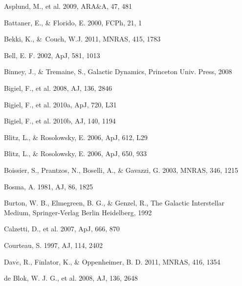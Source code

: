 \documentclass[12pt,preprint]{aastex}
\begin{document}
\begin{thebibliography}{}

 Asplund, M., et al. 2009, ARA\&A, 47, 481

 Battaner, E., \& Florido, E. 2000, FCPh, 21, 1

         Bekki, K., \&\ Couch, W.J. 2011, MNRAS, 415, 1783

 Bell, E. F. 2002, ApJ, 581, 1013

 Binney, J., \& Tremaine, S., Galactic Dynamics, Princeton Univ. Press, 2008


Bigiel, F., et al. 2008, AJ, 136, 2846

Bigiel, F., et al. 2010a, ApJ, 720, L31

Bigiel, F., et al. 2010b, AJ, 140, 1194


 Blitz, L., \& Rosolowsky, E. 2006, ApJ, 612, L29

 Blitz, L., \& Rosolowsky, E. 2006, ApJ, 650, 933

 Boissier, S., Prantzos, N., Boselli, A., \& Gavazzi, G. 2003, MNRAS, 346, 1215

 Bosma, A. 1981, AJ, 86, 1825



 Burton, W. B., Elmegreen, B. G., \& Genzel, R., The Galactic Interstellar Medium, Springer-Verlag Berlin Heidelberg, 1992

 Calzetti, D., et al. 2007, ApJ, 666, 870

Courteau, S. 1997, AJ, 114, 2402

 Dav$\acute{e}$, R., Finlator, K., \& Oppenheimer, B. D. 2011, MNRAS, 416, 1354

 de Blok, W. J. G., et al. 2008, AJ, 136, 2648


\end{thebibliography}
\end{document}
